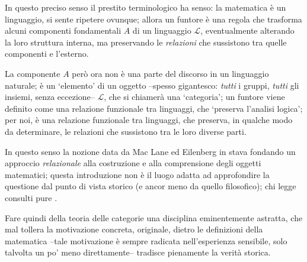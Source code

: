 In questo preciso senso il prestito terminologico ha senso: la matematica è un linguaggio, si sente ripetere ovunque; allora un funtore è una regola che trasforma alcuni componenti fondamentali $A$ di un linguaggio $\mathcal{L}$, eventualmente alterando la loro struttura interna, ma preservando le \emph{relazioni} che sussistono tra quelle componenti e l'esterno.

La componente $A$ però ora non è una parte del discorso in un linguaggio naturale; è un `elemento' di un oggetto --spesso gigantesco: \emph{tutti} i gruppi, \emph{tutti} gli insiemi, senza eccezione-- $\mathcal{L}$, che si chiamerà una `categoria'; un funtore viene definito come una relazione funzionale tra linguaggi, che `preserva l'analisi logica'; per noi, è una relazione funzionale tra linguaggi, che preserva, in qualche modo da determinare, le relazioni che sussistono tra le loro diverse parti.

In questo senso la nozione data da Mac Lane ed Eilenberg in \cite{gtone} stava fondando un approccio \emph{relazionale} alla costruzione e alla comprensione degli oggetti matematici; questa introduzione non è il luogo adatta ad approfondire la questione dal punto di vista storico (e ancor meno da quello filosofico); chi legge consulti pure \cite{marquis, kromer}.

\medskip
Fare quindi della teoria delle categorie una disciplina eminentemente astratta, che mal tollera la motivazione concreta, originale, dietro le definizioni della matematica --tale motivazione è sempre radicata nell'esperienza sensibile, solo talvolta un po' meno direttamente-- tradisce pienamente la verità storica.

